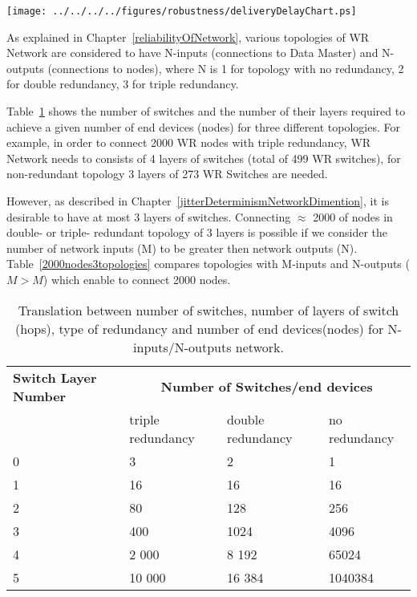 \begin{center}
	\texttt{[image: ../../../../figures/robustness/deliveryDelayChart.ps]}
	\label{fig:deliveryDelayChart}
\end{center}

As explained in Chapter~\ref{reliabilityOfNetwork}, various topologies of WR
Network are considered to have N-inputs (connections to Data Master) and
N-outputs (connections to nodes), where N is 1 for topology with no redundancy,
2 for double redundancy, 3 for triple redundancy. 

Table~\ref{tab:translation3topologies} shows the number of switches and the
number of their layers required to achieve a given number of end devices (nodes)
for three different topologies.
For example, in order to connect 2000 WR nodes with triple redundancy, WR
Network needs to consists of 4 layers of switches (total of 499 WR switches),
for non-redundant topology 3 layers of 273 WR Switches are needed. 

However, as described in Chapter~\ref{jitterDeterminismNetworkDimention}, it is
desirable to have at most 3 layers of switches. Connecting $\approx$ 2000 of
nodes in double- or triple- redundant topology of 3 layers is possible if we
consider the number of network inputs (M) to be greater then network outputs
(N). Table~\ref{2000nodes3topologies} compares topologies with M-inputs and
N-outputs ($M>M$) which enable to connect 2000 nodes.

\begin{table}[ht]
\caption{Translation between number of switches, number of layers of switch 
(hops), type of redundancy and number of end devices(nodes) for
N-inputs/N-outputs network.} 
\centering 
\begin{tabular}{| p{1.9cm} | p{2.7cm} | p{2.7cm} | p{2.5cm} |}       
\hline
\textbf{Switch Layer Number}& \multicolumn{3}{|c|}{\textbf{Number of
Switches/end devices}}  \\
      & triple redundancy & double redundancy & no redundancy   \\ \hline
0     & 3                 & 2                 & 1                  \\ \hline
1     & 16                & 16                & 16                \\ \hline
2     & 80                & 128               & 256               \\ \hline
3     & 400               & 1024              & 4096             \\ \hline
4     & 2 000             & 8 192             & 65024          \\ \hline
5     & 10 000            & 16 384            & 1040384        \\ \hline
\end{tabular}
\label{tab:translation3topologies}
\end{table}

